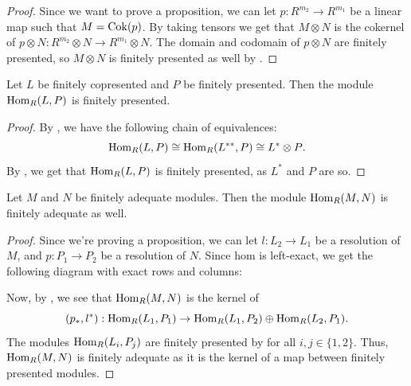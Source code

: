 \begin{proof}
  Since we want to prove a proposition, we can let $p : R^{m_2} \to R^{m_1}$ be a linear map such that $M = \operatorname{Cok}(p)$.
  By taking tensors we get that $M \otimes N$ is the cokernel of $p \otimes N : R^{m_2} \otimes N \to R^{m_1} \otimes N$.
  The domain and codomain of $p \otimes N$ are finitely presented, so $M \otimes N$ is finitely presented as well by .
\end{proof}

\begin{lemma}\label{lem:lin-adeq-fp-hom-fp}
  Let $L$ be finitely copresented and $P$ be finitely presented.
  Then the module $\mathrm{Hom}_R(L,P)$ is finitely presented.
\end{lemma}

\begin{proof}
  By , we have the following chain of equivalences:
  \begin{equation*}
    \mathrm{Hom}_R(L,P) \cong \mathrm{Hom}_R(L^{\ast\ast},P) \cong L^\ast \otimes P\textup{.}
  \end{equation*}
  By , we get that $\mathrm{Hom}_R(L,P)$ is finitely presented, as $L^\ast$ and $P$ are so.
\end{proof}

\begin{proposition}\label{prp:fin-adeq-hom-closure}
  Let $M$ and $N$ be finitely adequate modules.
  Then the module $\mathrm{Hom}_R(M,N)$ is finitely adequate as well.
\end{proposition}

\begin{proof}
  Since we're proving a proposition, we can let $l : L_2 \to L_1$ be a resolution of $M$, and $p : P_1 \to P_2$ be a resolution of $N$.
  Since hom is left-exact, we get the following diagram with exact rows and columns:
  \begin{center}
  \end{center}

  Now, by , we see that $\mathrm{Hom}_R(M,N)$ is the kernel of
  \[
    (p_\ast, l^\ast) : \mathrm{Hom}_R(L_1,P_1) \to \mathrm{Hom}_R(L_1,P_2) \oplus \mathrm{Hom}_R(L_2,P_1).
  \]
  The modules $\mathrm{Hom}_R(L_i,P_j)$ are finitely presented by  for all $i,j \in \{1,2\}$.
  Thus, $\mathrm{Hom}_R(M,N)$ is finitely adequate as it is the kernel of a map between finitely presented modules.
\end{proof}

